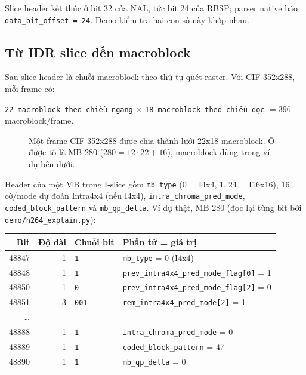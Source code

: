 \documentclass[11pt,a4paper]{article}
\begin{document}
Slice header kết thúc ở bit 32 của NAL, tức bit 24 của RBSP; parser native báo
\texttt{data\_bit\_offset = 24}. Demo kiểm tra hai con số này khớp nhau.

\subsection{Từ IDR slice đến macroblock}

Sau slice header là chuỗi macroblock theo thứ tự quét raster. Với CIF 352x288,
mỗi frame có:

\begin{center}
\texttt{22 macroblock theo chiều ngang} \(\times\)
\texttt{18 macroblock theo chiều dọc}
\(= 396\) macroblock/frame.
\end{center}

\begin{figure}[H]
\centering
{}
\caption{Một frame CIF 352x288 được chia thành lưới 22x18 macroblock. Ô được tô là
MB 280 (\(280 = 12 \cdot 22 + 16\)), macroblock dùng trong ví dụ bên dưới.}
\label{fig:macroblock-grid}
\end{figure}

Header của một MB trong I-slice gồm \texttt{mb\_type} (0 = I4x4, 1..24 = I16x16),
16 cờ/mode dự đoán Intra4x4 (nếu I4x4), \texttt{intra\_chroma\_pred\_mode},
\texttt{coded\_block\_pattern} và \texttt{mb\_qp\_delta}. Ví dụ thật, MB 280 (đọc
lại từng bit bởi \texttt{demo/h264\_explain.py}):

\begin{center}
\small
\begin{tabular}{rrll}
\toprule
Bit & Độ dài & Chuỗi bit & Phần tử = giá trị \\
\midrule
48847 & 1 & \texttt{1} & \texttt{mb\_type} = 0 (I4x4) \\
48848 & 1 & \texttt{1} & \texttt{prev\_intra4x4\_pred\_mode\_flag[0]} = 1 \\
48850 & 1 & \texttt{0} & \texttt{prev\_intra4x4\_pred\_mode\_flag[2]} = 0 \\
48851 & 3 & \texttt{001} & \texttt{rem\_intra4x4\_pred\_mode[2]} = 1 \\
\ldots & & & \\
48888 & 1 & \texttt{1} & \texttt{intra\_chroma\_pred\_mode} = 0 \\
48889 & 1 & \texttt{1} & \texttt{coded\_block\_pattern} = 47 \\
48890 & 1 & \texttt{1} & \texttt{mb\_qp\_delta} = 0 \\
\bottomrule
\end{tabular}
\end{center}
\end{document}
